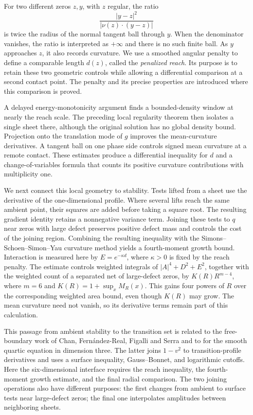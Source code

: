 For two different zeros $z,y$, with $z$ regular, the ratio
\[
\frac{|y-z|^2}{|\nu(z)\cdot(y-z)|}
\]
is twice the radius of the normal tangent ball through $y$.
When the denominator vanishes, the ratio is interpreted as
$+\infty$ and there is no such finite ball.
As $y$ approaches $z$, it also records curvature.
We use a smoothed angular penalty to define a comparable length
$d(z)$, called the \emph{penalized reach}.
Its purpose is to retain these two geometric controls while
allowing a differential comparison at a second contact point.
The penalty and its precise properties are introduced where
this comparison is proved.

A delayed energy-monotonicity argument finds a bounded-density
window at nearly the reach scale.  The preceding local regularity
theorem then isolates a single sheet there, although the original
solution has no global density bound.
Projection onto the translation mode of $g$ improves the
mean-curvature derivatives.  A tangent ball on one phase side
controls signed mean curvature at a remote contact.
These estimates produce a differential inequality for $d$ and
a change-of-variables formula that counts its positive curvature
contributions with multiplicity one.

We next connect this local geometry to stability.
Tests lifted from a sheet use the derivative of the
one-dimensional profile.  Where several lifts reach the same
ambient point, their squares are added before taking a square
root.  The resulting gradient identity retains a nonnegative
variance term.
Joining these tests to $q$ near zeros with large defect preserves
positive defect mass and controls the cost of the joining region.
Combining the resulting inequality with the
Simons--Schoen--Simon--Yau curvature method
\cite{Simons1968,SchoenSimonYau1975} yields a fourth-moment growth
bound.  Interaction is measured here by $E=e^{-\kappa d}$,
where $\kappa>0$ is fixed by the reach penalty.
The estimate controls weighted integrals of $|A|^4+D^2+E^2$,
together with the weighted count of a separated net of large-defect zeros, by
$K(R)R^{m-4}$, where $m=6$ and
$K(R)=1+\sup_xM_R(x)$.
This gains four powers of $R$ over the corresponding weighted
area bound, even though $K(R)$ may grow.
The mean curvature need not vanish, so its derivative terms
remain part of this calculation.

This passage from ambient stability to the transition set is
related to the free-boundary work of Chan, Fern\'andez-Real,
Figalli and Serra \cite{CFFS2025} and to
\citet[Sections~3 and~5]{LLWWW2026} for the smooth quartic
equation in dimension three.
The latter joins $1-v^2$ to transition-profile derivatives and
uses a surface inequality, Gauss--Bonnet, and logarithmic cutoffs.
Here the six-dimensional interface requires the reach inequality,
the fourth-moment growth estimate, and the final radial comparison.
The two joining operations also have different purposes:
the first changes from ambient to surface tests near large-defect
zeros; the final one interpolates amplitudes between neighboring
sheets.


